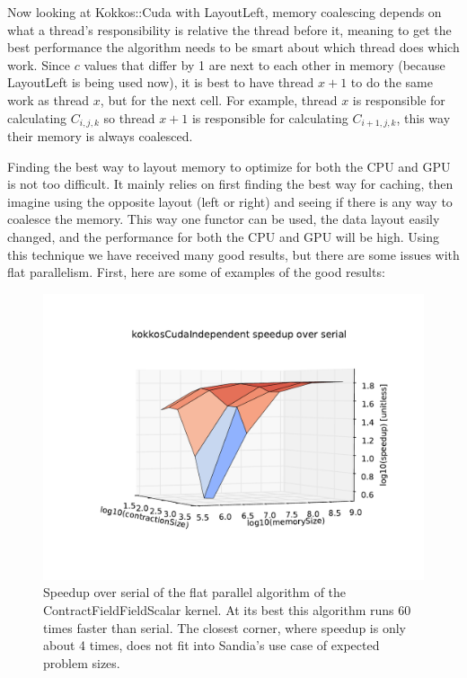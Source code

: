 Now looking at Kokkos::Cuda with LayoutLeft, memory coalescing depends on what a thread's responsibility is relative the thread before it, meaning to get the best performance the algorithm needs to be smart about which thread does which work. Since $c$ values that differ by 1 are next to each other in memory (because LayoutLeft is being used now), it is best to have thread $x+1$ to do the same work as thread $x$, but for the next cell. For example, thread $x$ is responsible for calculating $C_{i, j, k}$ so thread $x+1$ is responsible for calculating $C_{i+1, j, k}$, this way their memory is always coalesced. 

Finding the best way to layout memory to optimize for both the CPU and GPU is not too difficult. It mainly relies on first finding the best way for caching, then imagine using the opposite layout (left or right) and seeing if there is any way to coalesce the memory. This way one functor can be used, the data layout easily changed, and the performance for both the CPU and GPU will be high. Using this technique we have received many good results, but there are some issues with flat parallelism. First, here are some of examples of the good results:

\begin{figure}[!ht]
\includegraphics[scale=.8]{CFFS_VersusSerial_kokkosCudaIndependent.pdf}
\caption{Speedup over serial of the flat parallel algorithm of the ContractFieldFieldScalar kernel. At its best this algorithm runs 60 times faster than serial. The closest corner, where speedup is only about 4 times, does not fit into Sandia's use case of expected problem sizes.
\label{lst:ContractFieldFieldScalar speedup over serial}} 
\end{figure}

